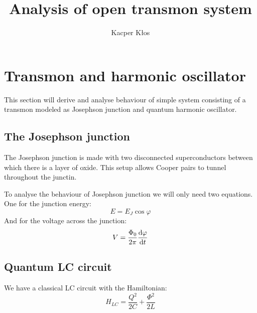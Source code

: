 \documentclass[12pt]{article}
\title{Analysis of open transmon system}
\author{Kacper Kłos}
\begin{document}
\maketitle

\section{Transmon and harmonic oscillator}

This section will derive and analyse behaviour of simple system consisting of a transmon modeled as Josephson junction and quantum harmonic oscillator.

\subsection{The Josephson junction}

The Josephson junction is made with two disconnected superconductors between which there is a layer of oxide. This setup allows Cooper pairs to tunnel throughout the junctin. 

To analyse the behaviour of Josephson junction we will only need two equations. One for the junction energy:
\begin{equation}
    E = E_J \cos{\varphi}
\end{equation}
And for the voltage across the junction:
\begin{equation}
    V = \frac{\Phi_0}{2\pi} \dv{\varphi}{t}
\end{equation}

\subsection{Quantum LC circuit}

We have a classical LC circuit with the Hamiltonian:
\begin{equation}
    H_{LC} = \frac{Q^2}{2 C} + \frac{\Phi^2}{2 L}
\end{equation}
\end{document}
